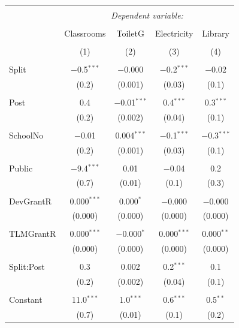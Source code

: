 \documentclass[12pt, a4paper]{article}
\begin{document}
\begin{table}[!htbp] \centering 
  \caption{} 
  \label{} 
\begin{tabular}{@{\extracolsep{5pt}}lcccc} 
\\[-1.8ex]\hline 
\hline \\[-1.8ex] 
 & \multicolumn{4}{c}{\textit{Dependent variable:}} \\ 
\cline{2-5} 
\\[-1.8ex] & Classrooms & ToiletG & Electricity & Library \\ 
\\[-1.8ex] & (1) & (2) & (3) & (4)\\ 
\hline \\[-1.8ex] 
 Split & $-$0.5$^{***}$ & $-$0.000 & $-$0.2$^{***}$ & $-$0.02 \\ 
  & (0.2) & (0.001) & (0.03) & (0.1) \\ 
  & & & & \\ 
 Post & 0.4 & $-$0.01$^{***}$ & 0.4$^{***}$ & 0.3$^{***}$ \\ 
  & (0.2) & (0.002) & (0.04) & (0.1) \\ 
  & & & & \\ 
 SchoolNo & $-$0.01 & 0.004$^{***}$ & $-$0.1$^{***}$ & $-$0.3$^{***}$ \\ 
  & (0.2) & (0.001) & (0.03) & (0.1) \\ 
  & & & & \\ 
 Public & $-$9.4$^{***}$ & 0.01 & $-$0.04 & 0.2 \\ 
  & (0.7) & (0.01) & (0.1) & (0.3) \\ 
  & & & & \\ 
 DevGrantR & 0.000$^{***}$ & 0.000$^{*}$ & $-$0.000 & $-$0.000 \\ 
  & (0.000) & (0.000) & (0.000) & (0.000) \\ 
  & & & & \\ 
 TLMGrantR & 0.000$^{***}$ & $-$0.000$^{*}$ & 0.000$^{***}$ & 0.000$^{**}$ \\ 
  & (0.000) & (0.000) & (0.000) & (0.000) \\ 
  & & & & \\ 
 Split:Post & 0.3 & 0.002 & 0.2$^{***}$ & 0.1 \\ 
  & (0.2) & (0.002) & (0.04) & (0.1) \\ 
  & & & & \\ 
 Constant & 11.0$^{***}$ & 1.0$^{***}$ & 0.6$^{***}$ & 0.5$^{**}$ \\ 
  & (0.7) & (0.01) & (0.1) & (0.2) \\ 

\end{tabular}
\end{table}
\end{document}
